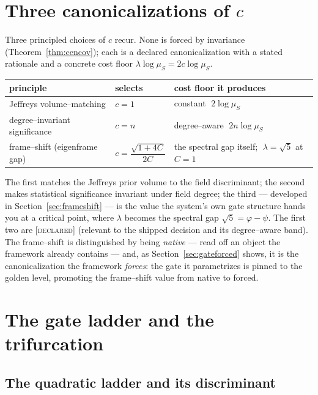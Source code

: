 \documentclass[11pt]{article}
\theoremstyle{plain}
\theoremstyle{definition}
\theoremstyle{remark}
\newcommand{\declared}{\textcolor{declaredc}{\textsc{[declared]}}}
\begin{document}
\section{Three canonicalizations of \texorpdfstring{$c$}{c}}\label{sec:canon}

Three principled choices of $c$ recur. None is forced by invariance (Theorem~\ref{thm:cencov}); each is a declared canonicalization with a stated rationale and a concrete cost floor $\lambda\log\mu_S = 2c\log\mu_S$.

\begin{center}
\renewcommand{\arraystretch}{1.35}
\begin{tabular}{@{}lll@{}}
\toprule
principle & selects & cost floor it produces \\
\midrule
Jeffreys volume--matching & $c=1$ & constant $\;2\log\mu_S$ \\
degree--invariant significance & $c=n$ & degree--aware $\;2n\log\mu_S$ \\
frame--shift (eigenframe gap) & $c=\dfrac{\sqrt{1+4C}}{2C}$ & the spectral gap itself; $\;\lambda=\sqrt5$ at $C=1$ \\
\bottomrule
\end{tabular}
\end{center}

\noindent The first matches the Jeffreys prior volume to the field discriminant; the second makes statistical significance invariant under field degree; the third --- developed in Section~\ref{sec:frameshift} --- is the value the system's own gate structure hands you at a critical point, where $\lambda$ becomes the spectral gap $\sqrt5 = \varphi-\psi$. The first two are \declared{} (relevant to the shipped decision and its degree--aware band). The frame--shift is distinguished by being \emph{native} --- read off an object the framework already contains --- and, as Section~\ref{sec:gateforced} shows, it is the canonicalization the framework \emph{forces}: the gate it parametrizes is pinned to the golden level, promoting the frame--shift value from native to forced.

\section{The gate ladder and the trifurcation}\label{sec:ladder}

\subsection{The quadratic ladder and its discriminant}
\end{document}
